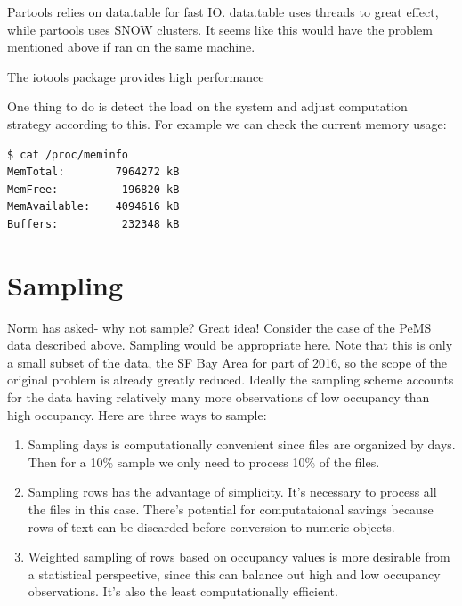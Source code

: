 \documentclass[12pt]{article}
\begin{document}
Partools relies on data.table for fast IO. data.table uses
threads to great effect, while partools uses SNOW clusters. It seems like
this would have the problem mentioned above if ran on the same machine.

The iotools package provides high performance

One thing to do is detect the load on the system and adjust computation
strategy according to
this. For example we can check the current memory usage:

\begin{verbatim}
$ cat /proc/meminfo
MemTotal:        7964272 kB
MemFree:          196820 kB
MemAvailable:    4094616 kB
Buffers:          232348 kB
\end{verbatim}

\section{Sampling}

Norm has asked- why not sample? Great idea! Consider the case of the PeMS
data described above. Sampling would be appropriate here. Note that
this is only a small subset of the data, the SF Bay Area for part of 2016,
so the scope of the original problem is already greatly reduced. 
Ideally the sampling scheme accounts for the data having relatively many
more observations of low occupancy than high occupancy. 
Here are three ways to sample:

\begin{enumerate}

    \item Sampling days is computationally convenient since files are
        organized by days. Then for a 10\% sample we only need to process
        10\% of the files. 

    \item Sampling rows has the advantage of simplicity. It's necessary to
        process all the files in this case. There's potential for
        computataional savings because rows of text can be discarded
        before conversion to numeric objects.

    \item Weighted sampling of rows based on occupancy values is more
        desirable from a statistical perspective, since this can balance
        out high and low occupancy observations.  It's also the least
        computationally efficient.

\end{enumerate}
\end{document}
